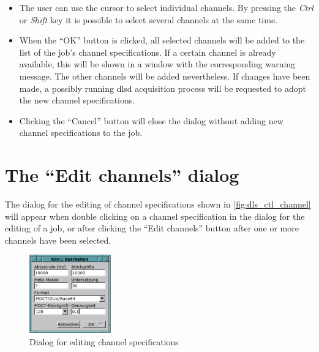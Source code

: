 \documentclass[a4paper,12pt,BCOR6mm,bibtotoc,idxtotoc]{scrbook}
\begin{document}
\begin{itemize}

\item The user can use the cursor to select individual channels. By pressing
the \textit{Ctrl} or \textit{Shift} key it is possible to select several
channels at the same time.

\item When the ``OK'' button is clicked, all selected channels will be added
to the list of the job’s channel specifications. If a certain channel is
already available, this will be shown in a window with the corresponding
warning message. The other channels will be added nevertheless. If changes
have been made, a possibly running dlsd acquisition process will be requested
to adopt the new channel specifications.

\item Clicking the ``Cancel'' button will close the dialog without adding new
channel specifications to the job.

\end{itemize}


\section{The ``Edit channels'' dialog} \label{sec:manager_kanaele_edit}

The dialog for the editing of channel specifications shown in
\autoref{fig:dls_ctl_channel} will appear when double clicking on a channel
specification in the dialog for the editing of a job, or after clicking the
``Edit channels'' button after one or more channels have been selected.

\begin{figure}[tbh] \begin{center} \includegraphics[width=100pt]{bilder/ctl_channel} \end{center} \caption{Dialog for editing channel specifications} \label{fig:dls_ctl_channel} \end{figure}
\end{document}
